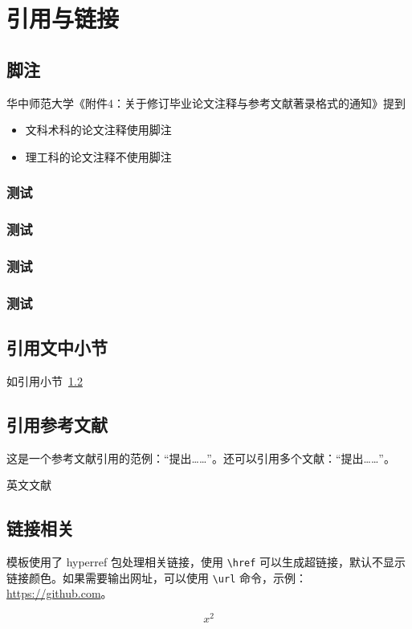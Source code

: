 
\chapter{引用与链接}

\section{脚注}

华中师范大学《附件4：关于修订毕业论文注释与参考文献著录格式的通知》提到

\begin{itemize}
  \item 文科术科的论文注释使用脚注
  \item 理工科的论文注释不使用脚注
\end{itemize}

\subsection{测试}
\subsection{测试}
\subsection{测试}
\subsection{测试}

\zhlipsum[1]



\section{引用文中小节}\label{sec:ref}

如引用小节~\ref{sec:ref}



\section{引用参考文献}

这是一个参考文献引用的范例：“\parencite{邱泽奇建构与分化}提出……”。还可以引用多个文献：“\parencite{丁文祥rawtype,李晓东rawtype}提出……”。

英文文献 \parencite{feynman2011feynman}


\section{链接相关}


模板使用了 hyperref 包处理相关链接，使用 \verb|\href| 可以生成超链接，默认不显示链接颜色。如果需要输出网址，可以使用 \verb|\url| 命令，示例：\url{https://github.com}。


\begin{equation}
  x^2
\end{equation}